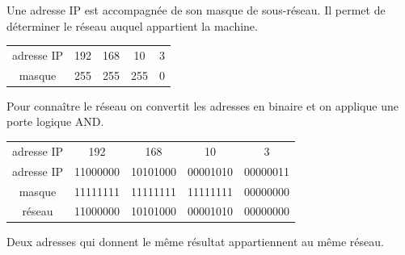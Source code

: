 \documentclass[svgnames,11pt]{beamer}
\begin{document}
\begin{frame}
    Une adresse IP est accompagnée de son masque de sous-réseau. Il permet de déterminer le réseau auquel appartient la machine.
    \begin{center}
        \begin{tabular}{ccccc}
            adresse IP & 192 & 168 & 10  & 3 \\
            masque     & 255 & 255 & 255 & 0 \\
        \end{tabular}
    \end{center}

\end{frame}

\begin{frame}
    Pour connaître le réseau on convertit les adresses en binaire et on applique une porte logique AND.
    \begin{center}
        \begin{tabular}{ccccc}
            adresse IP & 192      & 168      & 10       & 3        \\
            adresse IP & 11000000 & 10101000 & 00001010 & 00000011 \\
            masque     & 11111111 & 11111111 & 11111111 & 00000000 \\
            réseau     & 11000000 & 10101000 & 00001010 & 00000000 \\
        \end{tabular}
    \end{center}

    Deux adresses qui donnent le même résultat appartiennent au même réseau.
\end{frame}
\end{document}
